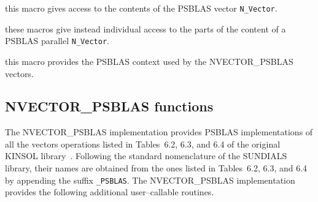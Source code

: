 \documentclass[twoside,a4paper]{refart}
\begin{document}
 this macro gives access to the contents of the PSBLAS vector \texttt{N\_Vector}.

 these macros give instead individual access to the parts of the content of a PSBLAS parallel \texttt{N\_Vector}.  

 this macro provides the PSBLAS context used by the NVECTOR\_PSBLAS vectors.

\subsection{NVECTOR\_PSBLAS functions}

The NVECTOR\_PSBLAS implementation provides PSBLAS implementations of all the vectors operations listed in Tables~6.2, 6.3, and 6.4 of the original KINSOL library~\cite{kinsolguide}. Following the standard nomenclature of the SUNDIALS library, their names are obtained from the ones listed in Tables~6.2, 6.3, and 6.4 by appending the suffix \texttt{\_PSBLAS}. The NVECTOR\_PSBLAS implementation provides the following additional user--callable routines.
\end{document}

